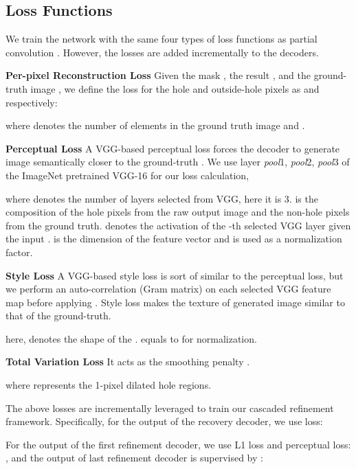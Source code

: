 \documentclass[journal]{IEEEtran}
\begin{document}
\subsection{Loss Functions}
We train the network with the same four types of loss functions as partial convolution \cite{liu2018image}. However, the losses are added incrementally to the decoders. 

\textbf{Per-pixel Reconstruction Loss} Given the mask , the result , and the ground-truth image , we define the  loss for the hole and outside-hole pixels as  and  respectively: 


\noindent where denotes the number of elements in the ground truth image  and {\color{black}{ is the binary mask with zeros indicating missing pixels}}.



\textbf{Perceptual Loss} A VGG-based perceptual loss forces the decoder to generate image semantically closer to the ground-truth \cite{gatys2015neural}. We use layer \emph{pool}1, \emph{pool}2, \emph{pool}3 of the ImageNet pretrained VGG-16 \cite{simonyan2014very} for our loss calculation,

\noindent where  denotes the number of layers selected from VGG, here it is 3.  is the composition of the hole pixels from the raw output image  and the non-hole pixels from the ground truth.  denotes the activation of the -th selected VGG layer given the input .  is the dimension of the feature vector  and is used as a normalization factor.



\textbf{Style Loss} A VGG-based style loss is sort of similar to the perceptual loss, but we perform an auto-correlation (Gram matrix) on each selected VGG feature map before applying . Style loss makes the texture of generated image similar to that of the ground-truth. 

\noindent here,  denotes the shape of the .  equals to  for normalization.

\textbf{Total Variation Loss} It acts as the smoothing penalty \cite{johnson2016perceptual}. 

\noindent where  represents the 1-pixel dilated hole regions.

The above losses are incrementally leveraged to train our cascaded refinement framework. Specifically, for the output of the recovery decoder, we use  loss:

For the output of the first refinement decoder, we use L1 loss and perceptual loss: , and the output of last refinement decoder is supervised by :
\end{document}
